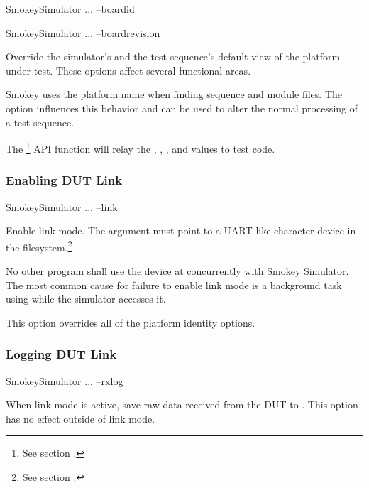 \begin{CommandLine}
SmokeySimulator ... --boardid ~~
\end{CommandLine}

\begin{CommandLine}
SmokeySimulator ... --boardrevision ~~
\end{CommandLine}

Override the simulator's and the test sequence's default view of the platform
under test.  These options affect several functional areas.

Smokey uses the platform name when finding sequence and module files.  The
option  influences this behavior and can be used to alter
the normal processing of a test sequence.

The \footnote{See section .} API
function will relay the , , ,
and  values to test code.

\subsubsection{Enabling DUT Link}

\begin{CommandLine}
SmokeySimulator ... --link ~~
\end{CommandLine}

Enable link mode.  The argument  must point to a UART-like
character device in the filesystem.\footnote{See section
.}

No other program shall use the device at  concurrently with
Smokey Simulator.  The most common cause for failure to enable link mode is a
background task using  while the simulator accesses it.

This option overrides all of the platform identity options.

\subsubsection{Logging DUT Link}

\begin{CommandLine}
SmokeySimulator ... --rxlog ~~
\end{CommandLine}

When link mode is active, save raw data received from the DUT to
.  This option has no effect outside of link mode.  

